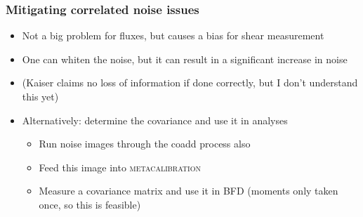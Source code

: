 \documentclass{beamer}
\newcommand{\mcal}{\textsc{metacalibration}}
\begin{document}
\frame
{
    \frametitle{Mitigating correlated noise issues}

 
    \begin{itemize}

        \item Not a big problem for fluxes, but causes a bias for shear measurement

        \item One can whiten the noise, but it can result in a significant increase in noise

        \item (Kaiser claims no loss of information if done correctly, but I don't understand this yet)

        \item Alternatively: determine the covariance and use it in analyses
            \begin{itemize}
                \item Run noise images through the coadd process also
                \item Feed this image into \mcal
                \item Measure a covariance matrix and use it in BFD (moments only taken once, so this is feasible)
            \end{itemize}


    \end{itemize}

}
\end{document}
